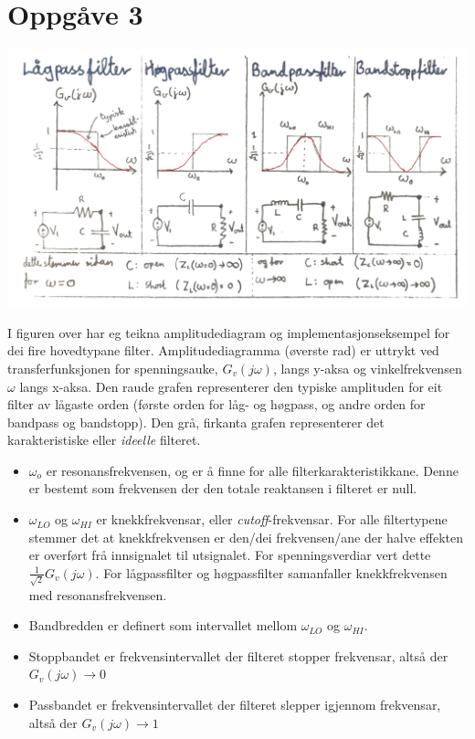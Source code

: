 \documentclass[12pt,a4paper]{article}
\begin{document}
  \newpage

  \section*{Oppgåve 3}
    \begin{center}
      \includegraphics[scale=0.8]{10_filter.png}
    \end{center}
    I figuren over har eg teikna amplitudediagram og implementasjonseksempel
    for dei fire hovedtypane filter. Amplitudediagramma (øverste rad) er uttrykt ved
    transferfunksjonen for spenningsauke, $G_v(j\omega)$, langs y-aksa og vinkelfrekvensen $\omega$
    langs x-aksa. Den raude grafen representerer den typiske amplituden for eit filter av
    lågaste orden (første orden for låg- og høgpass, og andre orden for bandpass og bandstopp).
    Den grå, firkanta grafen representerer det karakteristiske eller \textit{ideelle} filteret.
    \begin{itemize}
      \item $\omega_o$ er resonansfrekvensen, og er å finne for alle
        filterkarakteristikkane.  Denne er bestemt som frekvensen der den
        totale reaktansen i filteret er null.
      \item $\omega_{LO}$ og $\omega_{HI}$ er knekkfrekvensar, eller
        \textit{cutoff}-frekvensar.  For alle filtertypene stemmer det at
        knekkfrekvensen er den/dei frekvensen/ane der halve effekten er
        overført frå innsignalet til utsignalet. For spenningsverdiar vert
        dette $\frac{1}{\sqrt{2}}G_v(j\omega)$. For lågpassfilter og
        høgpassfilter samanfaller knekkfrekvensen med resonansfrekvensen.
      \item Bandbredden er definert som intervallet mellom $\omega_{LO}$ og $\omega_{HI}$.
      \item Stoppbandet er frekvensintervallet der filteret stopper frekvensar,
        altså der $G_v(j\omega) \rightarrow 0$
      \item Passbandet er frekvensintervallet der filteret slepper igjennom
        frekvensar, altså der $G_v(j\omega) \rightarrow 1$
    \end{itemize}
\end{document}
